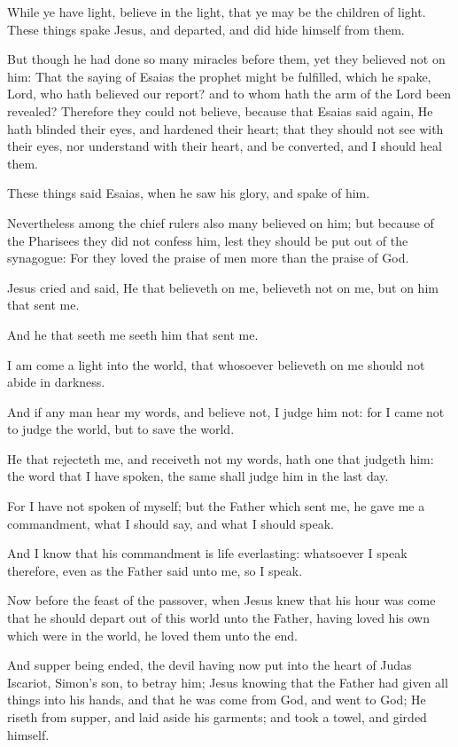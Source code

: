\Verse While ye have light, believe in the light, that ye may be the children of light. These things spake Jesus, and departed, and did hide himself from them.

\Verse But though he had done so many miracles before them, yet they believed not on him: \Verse That the saying of Esaias the prophet might be fulfilled, which he spake, Lord, who hath believed our report? and to whom hath the arm of the Lord been revealed?  \Verse Therefore they could not believe, because that Esaias said again, \Verse He hath blinded their eyes, and hardened their heart; that they should not see with their eyes, nor understand with their heart, and be converted, and I should heal them.

\Verse These things said Esaias, when he saw his glory, and spake of him.

\Verse Nevertheless among the chief rulers also many believed on him; but because of the Pharisees they did not confess him, lest they should be put out of the synagogue: \Verse For they loved the praise of men more than the praise of God.

\Verse Jesus cried and said, He that believeth on me, believeth not on me, but on him that sent me.

\Verse And he that seeth me seeth him that sent me.

\Verse I am come a light into the world, that whosoever believeth on me should not abide in darkness.

\Verse And if any man hear my words, and believe not, I judge him not: for I came not to judge the world, but to save the world.

\Verse He that rejecteth me, and receiveth not my words, hath one that judgeth him: the word that I have spoken, the same shall judge him in the last day.

\Verse For I have not spoken of myself; but the Father which sent me, he gave me a commandment, what I should say, and what I should speak.

\Verse And I know that his commandment is life everlasting: whatsoever I speak therefore, even as the Father said unto me, so I speak.


\Chapter
\Verse Now before the feast of the passover, when Jesus knew that his hour was come that he should depart out of this world unto the Father, having loved his own which were in the world, he loved them unto the end.

\Verse And supper being ended, the devil having now put into the heart of Judas Iscariot, Simon's son, to betray him; \Verse Jesus knowing that the Father had given all things into his hands, and that he was come from God, and went to God; \Verse He riseth from supper, and laid aside his garments; and took a towel, and girded himself.

